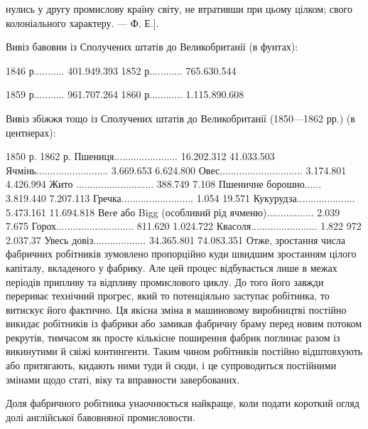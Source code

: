 нулись у другу промислову країну світу, не втративши при цьому цілком;
свого колоніального характеру. — Ф. Е.].

Вивіз бавовни із Сполучених штатів до Великобританії (в фунтах):

1846 р........... 401.949.393    1852 р............ 765.630.544

1859 р........... 961.707.264    1860 р............ 1.115.890.608

Вивіз збіжжя тощо із Сполучених штатів до Великобританії
(1850—1862 рр.) (в центнерах):

                                                            1850 р.                 1862 р.
Пшениця.......................        16.202.312           41.033.503
Ячмінь..........................           3.669.653           6.624.800
Овес..............................         3.174.801             4.426.994
Жито ............................            388.749                7.108
Пшеничне борошно......            3.819.440           7.207.113
Гречка..........................              1.054                  19.571
Кукурудза.....................          5.473.161         11.694.818
Веrе або Bigg (особливий
рід ячменю).................             2.039                    7.675
Горох............................          811.620              1.024.722
Квасоля........................        1.822 972              2.037.37
Увесь довіз...................          34.365.801            74.083.351
Отже, зростання числа фабричних робітників зумовлено пропорційно
куди швидшим зростанням цілого капіталу, вкладеного
у фабрику. Але цей процес відбувається лише в межах періодів
припливу та відпливу промислового циклу. До того його завжди
перериває технічний прогрес, який то потенціяльно заступає робітника,
то витискує його фактично. Ця якісна зміна в машиновому
виробництві постійно викидає робітників із фабрики або замикав
фабричну браму перед новим потоком рекрутів, тимчасом як
просте кількісне поширення фабрик поглинає разом із викинутими
й свіжі контингенти. Таким чином робітників постійно відштовхують
або притягають, кидають ними туди й сюди, і це
супроводиться постійними змінами щодо статі, віку та вправности
завербованих.

Доля фабричного робітника унаочнюється найкраще, коли
подати короткий огляд долі англійської бавовняної промисловости.

